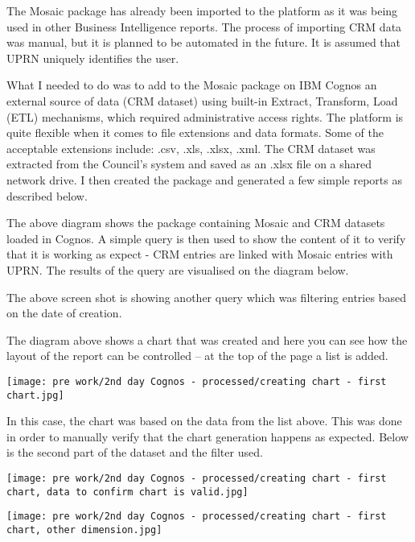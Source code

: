 The Mosaic package has already been imported to the platform as it was being used in other Business Intelligence reports. The process of importing CRM data was manual, but it is planned to be automated in the future. It is assumed that UPRN uniquely identifies the user.

What I needed to do was to add to the Mosaic package on IBM Cognos an external source of data (CRM dataset) using built-in Extract, Transform, Load (ETL) mechanisms, which required administrative access rights. The platform is quite flexible when it comes to file extensions and data formats. Some of the acceptable extensions include: .csv, .xls, .xlsx, .xml. The CRM dataset was extracted from the Council's system and saved as an .xlsx file on a shared network drive. I then created the package and generated a few simple reports as described below.

The above diagram shows the package containing Mosaic and CRM datasets loaded in Cognos. A simple query is then used to show the content of it to verify that it is working as expect - CRM entries are linked with Mosaic entries with UPRN. The results of the query are visualised on the diagram below.

The above screen shot is showing another query which was filtering entries based on the date of creation.

The diagram above shows a chart that was created and here you can see how the layout of the report can be controlled – at the top of the page a list is added.



\begin{center}
  \texttt{[image: pre work/2nd day Cognos - processed/creating chart - first chart.jpg]}
\end{center}

In this case, the chart was based on the data from the list above. This was done in order to manually verify that the chart generation happens as expected. Below is the second part of the dataset and the filter used.

\begin{center}
  \texttt{[image: pre work/2nd day Cognos - processed/creating chart - first chart, data to confirm chart is valid.jpg]}
\end{center}


\begin{center}
  \texttt{[image: pre work/2nd day Cognos - processed/creating chart - first chart, other dimension.jpg]}
\end{center}


